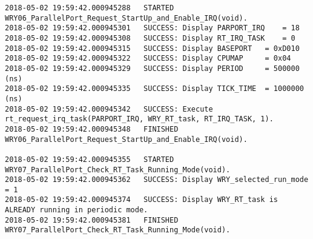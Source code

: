 \begin{lstlisting}[caption={App4-Full execution C/C++ code for Real Time (RTAI)}, label=App4-Full execution C/C++ code for Real Time (RTAI)]
2018-05-02 19:59:42.000945288 	STARTED  WRY06_ParallelPort_Request_StartUp_and_Enable_IRQ(void).
2018-05-02 19:59:42.000945301 	SUCCESS: Display PARPORT_IRQ 	= 18
2018-05-02 19:59:42.000945308 	SUCCESS: Display RT_IRQ_TASK 	= 0
2018-05-02 19:59:42.000945315 	SUCCESS: Display BASEPORT 	= 0xD010
2018-05-02 19:59:42.000945322 	SUCCESS: Display CPUMAP 	= 0x04
2018-05-02 19:59:42.000945329 	SUCCESS: Display PERIOD 	= 500000 (ns)
2018-05-02 19:59:42.000945335 	SUCCESS: Display TICK_TIME 	= 1000000 (ns)
2018-05-02 19:59:42.000945342 	SUCCESS: Execute rt_request_irq_task(PARPORT_IRQ, WRY_RT_task, RT_IRQ_TASK, 1).
2018-05-02 19:59:42.000945348 	FINISHED WRY06_ParallelPort_Request_StartUp_and_Enable_IRQ(void).

2018-05-02 19:59:42.000945355 	STARTED  WRY07_ParallelPort_Check_RT_Task_Running_Mode(void).
2018-05-02 19:59:42.000945362 	SUCCESS: Display WRY_selected_run_mode = 1
2018-05-02 19:59:42.000945374 	SUCCESS: Display WRY_RT_task is ALREADY running in periodic mode.
2018-05-02 19:59:42.000945381 	FINISHED WRY07_ParallelPort_Check_RT_Task_Running_Mode(void).


\end{lstlisting}
